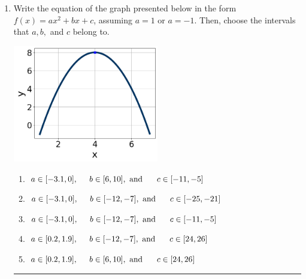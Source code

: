 \documentclass[14pt]{extbook}
\newcommand{\litem}[1]{\item#1\hspace*{-1cm}\rule{\textwidth}{0.4pt}}
\begin{document}
\begin{enumerate}
{\begin{enumerate}[label=\Alph*.]
\end{enumerate} }
\litem{
Write the equation of the graph presented below in the form $f(x)=ax^2+bx+c$, assuming  $a=1$ or $a=-1$. Then, choose the intervals that $a, b,$ and $c$ belong to.
\begin{center}
    \includegraphics[width=0.5\textwidth]{../Figures/quadraticGraphToEquationA.png}
\end{center}
\begin{enumerate}[label=\Alph*.]
\item \( a \in [-3.1, 0], \hspace*{5mm} b \in [6, 10], \text{ and } \hspace*{5mm} c \in [-11, -5] \)
\item \( a \in [-3.1, 0], \hspace*{5mm} b \in [-12, -7], \text{ and } \hspace*{5mm} c \in [-25, -21] \)
\item \( a \in [-3.1, 0], \hspace*{5mm} b \in [-12, -7], \text{ and } \hspace*{5mm} c \in [-11, -5] \)
\item \( a \in [0.2, 1.9], \hspace*{5mm} b \in [-12, -7], \text{ and } \hspace*{5mm} c \in [24, 26] \)
\item \( a \in [0.2, 1.9], \hspace*{5mm} b \in [6, 10], \text{ and } \hspace*{5mm} c \in [24, 26] \)


\end{enumerate}}
\end{enumerate}
\end{document}
